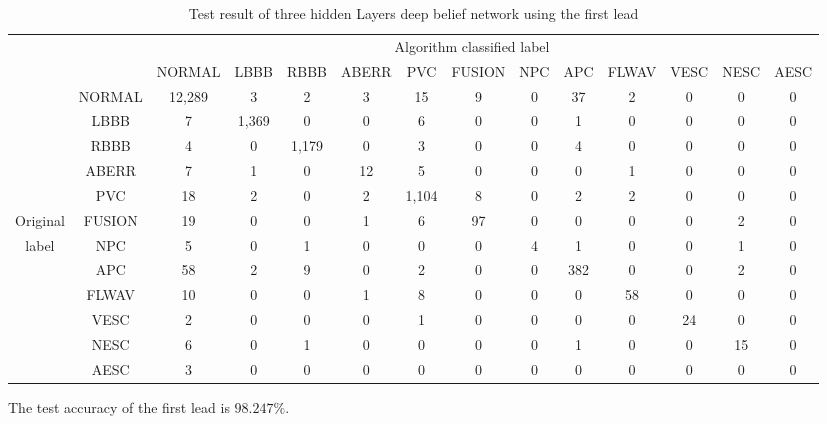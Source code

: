 \documentclass{bmcart}
\begin{document}
\begin{table}[htb]
\begin{center}
\begin{threeparttable}
\caption{Test result of three hidden Layers deep belief network using the first lead}
\label{table2}
\small
\begin{tabular}{cccccccccccccc}
\hline
\multicolumn{9}{r}{Algorithm classified label} \\
\cline{3-14}
		 &      & NORMAL & LBBB & RBBB & ABERR & PVC & FUSION & NPC & APC & FLWAV & VESC & NESC & AESC\\
\hline
 		 & NORMAL & 12,289& 3   &  2   &  3   &  15  &  9    &	0   &  37 &   2   &   0  &  0  &  0 \\
	     & LBBB   &  7    & 1,369&  0  &  0   &  6   &  0    &  0   &  1  &   0   &   0  &  0  &  0 \\
		 & RBBB   &  4    &  0  & 1,179&  0   &  3   &  0    &	0   &  4  &   0   &   0  &  0  &  0 \\
		 & ABERR  &  7    &  1  &  0   &  12  &  5   &  0    &	0   &  0  &   1   &   0  &  0  &  0 \\
		 & PVC    &  18   &  2  &  0   &  2   & 1,104&  8    &	0   &  2  &   2   &   0  &  0  &  0 \\
Original & FUSION &	 19   &  0  &  0   &  1   &  6   &   97  &	0   &  0  &   0   &   0  &  2  &  0 \\
label    & NPC    &	 5    &  0  &  1   &  0   &  0   &  0    &	4   &  1  &   0   &   0  &  1  &  0 \\
		 & APC    &	 58   &  2  &  9   &  0   &  2   &  0    &	0   &  382&   0   &   0  &  2  &  0 \\
		 & FLWAV  &	 10   &  0  &  0   &  1   &  8   &  0    &	0   &  0  &   58  &   0  &  0  &  0 \\
		 & VESC   &	 2    &  0  &  0   &  0   &  1   &  0    &	0   &  0  &   0   &  24  &  0  &  0 \\
		 & NESC   &	 6    &  0  &  1   &  0   &  0   &  0    &	0   &  1  &   0   &   0  &  15 &  0 \\
		 & AESC   &	 3    &  0  &  0   &  0   &  0   &  0    &	0   &  0  &   0   &   0  &  0  &  0 \\
\hline
\end{tabular}
\begin{tablenotes}
\item The test accuracy of the first lead is $98.247\%$.
\end{tablenotes}
\end{threeparttable}
\end{center}
\end{table}
\end{document}

